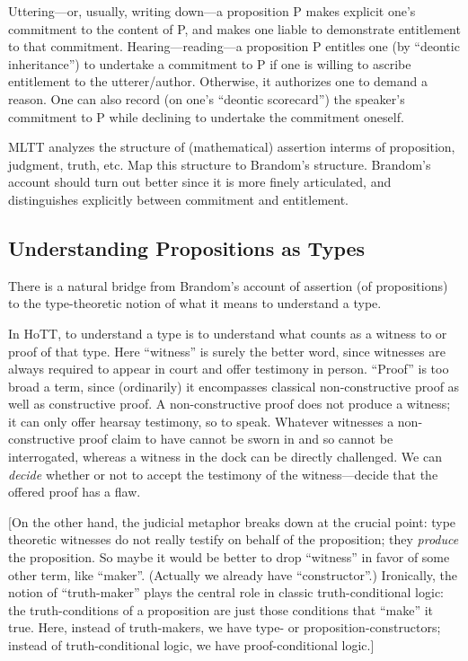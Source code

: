 Uttering---or, usually, writing down---a proposition P makes explicit
one's commitment to the content of P, and makes one liable to
demonstrate entitlement to that commitment.  Hearing---reading---a
proposition P entitles one (by ``deontic inheritance'') to undertake a
commitment to P if one is willing to ascribe entitlement to the
utterer/author.  Otherwise, it authorizes one to demand a reason.  One
can also record (on one's ``deontic scorecard'') the speaker's
commitment to P while declining to undertake the commitment oneself.

{\todo MLTT analyzes the structure of (mathematical) assertion interms
  of proposition, judgment, truth, etc.  Map this structure to
  Brandom's structure.  Brandom's account should turn out better since
  it is more finely articulated, and distinguishes explicitly between
  commitment and entitlement.}

\subsection{Understanding Propositions as Types}
\label{subs:brandomunderstanding}

There is a natural bridge from Brandom's account of assertion (of
propositions) to the type-theoretic notion of what it means to
understand a type.

In HoTT, to understand a type is to understand what counts as a
witness to or proof of that type.  Here ``witness'' is surely the
better word, since witnesses are always required to appear in court
and offer testimony in person.  ``Proof'' is too broad a term, since
(ordinarily) it encompasses classical non-constructive proof as well
as constructive proof.  A non-constructive proof does not produce a
witness; it can only offer hearsay testimony, so to speak.  Whatever
witnesses a non-constructive proof claim to have cannot be sworn in
and so cannot be interrogated, whereas a witness in the dock can be
directly challenged.  We can \textit{decide} whether or not to accept
the testimony of the witness---decide that the offered proof has a
flaw.

[On the other hand, the judicial metaphor breaks down at the crucial
  point: type theoretic witnesses do not really testify on behalf of
  the proposition; they \textit{produce} the proposition.  So maybe it
  would be better to drop ``witness'' in favor of some other term,
  like ``maker''.  (Actually we already have ``constructor''.)
  Ironically, the notion of ``truth-maker'' plays the central role in
  classic truth-conditional logic: the truth-conditions of a
  proposition are just those conditions that ``make'' it true.  Here,
  instead of truth-makers, we have type- or proposition-constructors;
  instead of truth-conditional logic, we have proof-conditional
  logic.]


